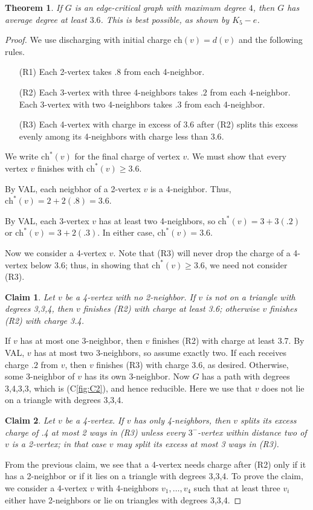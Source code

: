 \documentclass[12pt]{article}
\theoremstyle{plain}
\newtheorem{thm}{Theorem}[section]
\newtheorem{clm}{Claim}
\theoremstyle{definition}
\theoremstyle{remark}
\def\ch{\textrm{ch}}
\begin{document}
\begin{thm}
If $G$ is an edge-critical graph with maximum degree $4$, then $G$ has average
degree at least $3.6$.  This is best possible, as shown by $K_5-e$.
\end{thm}
\begin{proof}
We use discharging with initial charge $\ch(v)=d(v)$ and the following rules.
\begin{enumerate}
\item[(R1)] Each 2-vertex takes $.8$ from each 4-neighbor.
\item[(R2)] Each 3-vertex with three 4-neighbors takes $.2$ from each 4-neighbor.
Each 3-vertex with two 4-neighbors takes $.3$ from each 4-neighbor.
\item[(R3)] Each 4-vertex with charge in excess of $3.6$ after (R2) splits this
excess evenly among its 4-neighbors with charge less than $3.6$.
\end{enumerate}
	
We write $\ch^*(v)$ for the final charge of vertex $v$.
We must show that every vertex $v$ finishes with $\ch^*(v)\ge 3.6$.

By VAL, each neigbhor of a 2-vertex $v$ is a 4-neighbor.  Thus,
$\ch^*(v)=2+2(.8)=3.6$.

By VAL, each 3-vertex $v$ has at least two 4-neighbors, so $\ch^*(v)=3+3(.2)$ or
$\ch^*(v)=3+2(.3)$.  In either case, $\ch^*(v)=3.6$.
	
	Now we consider a 4-vertex $v$.  Note that (R3) will never drop the charge of a
	4-vertex below $3.6$; thus, in showing that $\ch^*(v)\ge 3.6$, we need not
	consider (R3).
	
	\begin{clm}
		Let $v$ be a 4-vertex with no 2-neighbor. 
		If $v$ is not on a triangle with degrees 3,3,4, then $v$ finishes (R2) with
		charge at least 3.6; otherwise $v$ finishes (R2) with charge 3.4.
		\label{clm1}
	\end{clm}
	If $v$ has at most one 3-neighbor, then $v$ finishes (R2) with charge at least 3.7.
	By VAL, $v$ has at most two 3-neighbors, so assume exactly two.  If each
	receives charge $.2$ from $v$, then $v$ finishes (R3) with charge 3.6, as
	desired.  Otherwise, some 3-neighbor of $v$ has its own 3-neighbor.  Now $G$ has
	a path with degrees 3,4,3,3, which is (C\ref{fig:C2}), and hence reducible.  
	Here we use that $v$ does not lie on a triangle with degrees 3,3,4.
	
	\begin{clm}
		Let $v$ be a 4-vertex.  If $v$ has only 4-neighbors, then $v$ splits its excess
		charge of .4 at most 2 ways in (R3) \emph{unless} every $3^-$-vertex within
		distance two of $v$ is a 2-vertex; in that case $v$ may split its excess at most
		3 ways in (R3).
		\label{clm2}
	\end{clm}
	From the previous claim, we see that a 4-vertex needs charge after (R2) only if
	it has a 2-neighbor or if it lies on a triangle with degrees 3,3,4.  To prove the
	claim, we consider a 4-vertex $v$ with 4-neighbors $v_1,\ldots, v_4$ such that
	at least three $v_i$ either have 2-neighbors or lie on triangles with degrees 3,3,4. 
	

\end{proof}
\end{document}

